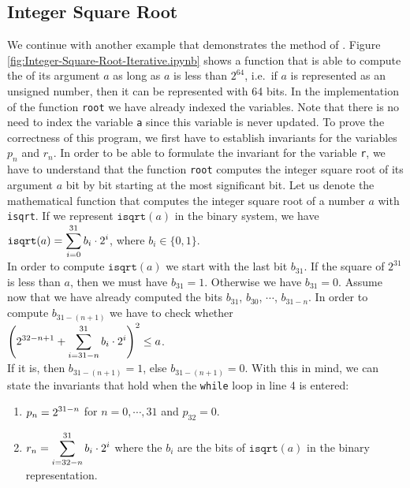 \subsection{Integer Square Root}
We continue with another example that demonstrates the method of .
Figure \ref{fig:Integer-Square-Root-Iterative.ipynb} shows a function that is able to compute the
 of its argument $a$ as long as $a$ is less than $2^{64}$, i.e.~if $a$ is represented as an unsigned
number, then it can be represented with 64 bits.  In the implementation of the function \texttt{root} we have
already indexed the variables.  Note that there is no 
need to index the variable \texttt{a} since this variable is never updated.  To prove the correctness of this
program, we first 
have to establish invariants for the variables $p_n$ and $r_n$.  In order to be able to formulate the invariant
for the variable \texttt{r}, we have to understand that the function \texttt{root} computes the integer square
root of its argument $a$ bit by bit starting at the most significant bit.  Let us denote the
mathematical function that computes the integer square root of a number $a$ with \texttt{isqrt}.  If we
represent $\mathtt{isqrt}(a)$ in the binary system, we have
\\[0.2cm]
\hspace*{1.3cm}
$\displaystyle \mathtt{isqrt}(a) = \sum\limits_{i=0}^{31} b_i \cdot 2^i$, \quad where $b_i \in \{0,1\}$.
\\[0.2cm]
In order to compute $\mathtt{isqrt}(a)$ we start with the last bit $b_{31}$.  If the square of $2^{31}$ is less
than $a$, then we must have $b_{31} = 1$.  Otherwise we have $b_{31} = 0$.  Assume now that we have already computed the
bits $b_{31}$, $b_{30}$, $\cdots$, $b_{31-n}$.  In order to compute $b_{31-(n+1)}$ we have to check whether
\\[0.2cm]
\hspace*{1.3cm}
$\displaystyle\left(\displaystyle 2^{32-{n+1}} + \sum\limits_{i=31-n}^{31} b_i \cdot 2^i \right)^2 \leq a$.
\\[0.2cm]
If it is, then  $b_{31-(n+1)} = 1$, else $b_{31-(n+1)} = 0$.
With this in mind, we can state the invariants that hold when the \texttt{while} loop in line 4 is entered:
\begin{enumerate}
\item $\displaystyle p_n = 2^{31 - n}$ \quad for $n=0,\cdots,31$ and $p_{32} = 0$.
\item $\displaystyle r_n = \sum\limits_{i=32-n}^{31} b_i \cdot 2^i$ \quad where the $b_i$ are the bits of
      $\mathtt{isqrt}(a)$ in the binary representation.
\end{enumerate}

